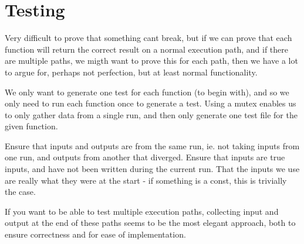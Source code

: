 \section{Testing}
Very difficult to prove that something cant break, but if we can prove that each function will return the correct result on a normal execution path, and if there are multiple paths, we migth want to prove this for each path, then we have a lot to argue for, perhaps not perfection, but at least normal functionality.

We only want to generate one test for each function (to begin with), and so we only need to run each function once to generate a test. Using a mutex enables us to only gather data from a single run, and then only generate one test file for the given function.

Ensure that inputs and outputs are from the same run, ie. not taking inputs from one run, and outputs from another that diverged.
Ensure that inputs are true inputs, and have not been written during the current run. That the inputs we use are really what they were at the start - if something is a const, this is trivially the case.

If you want to be able to test multiple execution paths, collecting input and output at the end of these paths seems to be the most elegant approach, both to ensure correctness and for ease of implementation.
